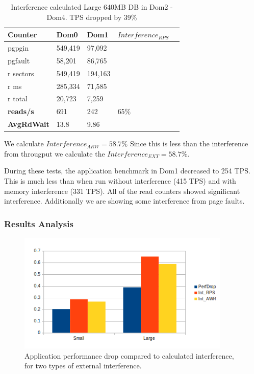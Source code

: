 \begin{table}[h]
\begin{tabular}{ l l l l p{5cm} }
  Counter     & Dom0    & Dom1    & $Interference_{RPS}$ \\
  \hline
	pgpgin    & 549,419 & 97,092 &  \\
	pgfault   &  58,201 & 86,765 &  \\
	r sectors & 549,419 &194,163 &  \\
	r ms      & 285,334 & 71,585 &  \\
	r total   &  20,723 &  7,259 &  \\
    \textbf{reads/s}    & 691 & 242 &   65\% \\
    \textbf{AvgRdWait}  & 13.8 & 9.86 &  \\ 
  \hline
\end{tabular}
\caption{Interference calculated Large 640MB DB in Dom2 - Dom4.  TPS dropped by 39\%}
\label{fig:InterferenceLg}
\end{table}
We calculate $Interference_{ARW} = 58.7\%$  Since this is less than the interference from througput we calculate the $Interference_{EXT} = 58.7\%$.

During these tests, the application benchmark in Dom1 decreased to 254 TPS.  This is much less than when run without interference (415 TPS) and with memory interference (331 TPS).  All of the read counters showed significant interference.  Additionally we are showing some interference from page faults.  

\subsubsection{Results Analysis}

\begin{figure}[!h]
  \begin{center}
  \includegraphics[width=4in]{images/IBM_PerfDrop_Int.png}
  \caption{Application performance drop compared to calculated interference, for two types of external interference.}
  \label{fig:perfDrop}
  \end{center}
\end{figure}

